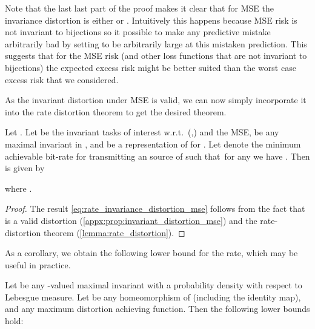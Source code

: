 \documentclass[final]{article}
\begin{document}
Note that the last last part of the proof makes it clear that for MSE the invariance distortion is either  or .
Intuitively this happens because MSE risk is not invariant to bijections so it possible to make any predictive mistake arbitrarily bad by setting  to be arbitrarily large at this mistaken prediction. 
This suggests that for the MSE risk (and other loss functions that are not invariant to bijections) the expected excess risk might be better suited than the worst case excess risk that we considered.


As the invariant distortion under MSE is valid, we can now simply incorporate it into the rate distortion theorem to get the desired theorem.

\begin{theorem}\label{thm:rate_invariance_distortion_mse}
Let .
Let  be the invariant tasks of interest w.r.t.\ (,) and the MSE,  be any maximal invariant in , and  be a representation of  for .
Let  denote the minimum achievable bit-rate for transmitting an \iid source of  such that\ for any  we have .
Then   is given by

where .
\end{theorem}
\begin{proof}
The result \eqref{eq:rate_invariance_distortion_mse} follows from the fact that \disttextinv{} is a valid distortion (\cref{appx:prop:invariant_distortion_mse}) and the rate-distortion theorem (\ref{lemma:rate_distortion}). 
\end{proof}
As a corollary, we obtain the following lower bound for the rate, which may be useful in practice.
\begin{corollary}
	Let  be any -valued maximal invariant with a probability density with respect to Lebesgue measure. Let  be any homeomorphism of  (including the identity map), and  any maximum distortion achieving function. Then the following lower bounds hold:
	 
\end{corollary}
\end{document}
